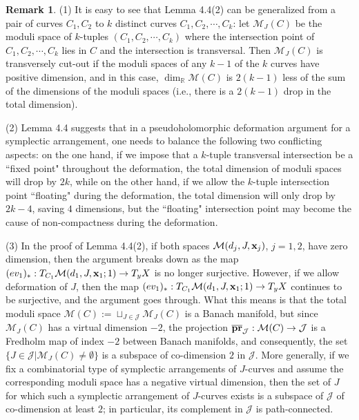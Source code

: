 \documentclass[11pt]{amsart}
\theoremstyle{plain}
\numberwithin{theorem}{section}
\theoremstyle{definition}
\newtheorem{remark}[theorem]{Remark}
\newcommand{\R}{{\mathbb R}}
\newcommand{\J}{{\mathcal J}}
\newcommand{\M}{{\mathcal M}}
\begin{document}
\begin{remark}
(1) It is easy to see that Lemma 4.4(2) can be generalized from a pair of curves $C_1,C_2$ to $k$ distinct curves 
$C_1,C_2,\cdots, C_k$: let $\M_J(C)$ be the moduli space of $k$-tuples $(C_1,C_2,\cdots,C_k)$ where the intersection point of $C_1,C_2,\cdots,C_k$ lies in $C$ and the intersection is transversal. Then $\M_J(C)$
is transversely cut-out if the moduli spaces of any $k-1$ of the $k$ curves have positive dimension, and in this case, 
$\dim_\R \M(C)$ is $2(k-1)$ less of the sum of the dimensions of the moduli spaces (i.e., there is a $2(k-1)$ drop in
the total dimension).

(2) Lemma 4.4 suggests that in a pseudoholomorphic deformation argument for a symplectic arrangement, one needs to balance the following two conflicting aspects: on the one hand, if we impose that a $k$-tuple transversal intersection be a ``fixed point" throughout the deformation, the total dimension of moduli spaces will drop by $2k$, while on the other hand, if we allow the $k$-tuple intersection point ``floating" during the deformation,  the total dimension will only drop by $2k-4$, saving $4$ dimensions, but the ``floating" intersection point may become the cause of non-compactness during the deformation.

(3) In the proof of Lemma 4.4(2), if both spaces $\M(d_j,J, {\bf x}_j)$, $j=1,2$, have zero dimension, then the argument breaks down as the map $(ev_1)_\ast: T_{C_1} \M(d_1,J, {\bf x}_1;1)\rightarrow T_y X$ is no longer surjective. 
However, if we allow deformation of $J$, then the map $(ev_1)_\ast: T_{C_1} \M(d_1,J, {\bf x}_1;1)\rightarrow T_y X$ continues to be surjective, and the argument goes through. What this means is that the total moduli space
$\M(C):=\sqcup_{J\in\J} \M_J(C)$ is a Banach manifold, but since $\M_J(C)$ has a virtual dimension $-2$, the 
projection $\overline{{\bf pr}}_\J: \M(C)\rightarrow \J$ is a Fredholm map of index $-2$ between Banach manifolds,
and consequently, the set $\{J\in\J |\M_J(C)\neq\emptyset\}$ is a subspace of co-dimension $2$ in $\J$. More generally, if we fix a combinatorial type of symplectic arrangements of $J$-curves and assume the corresponding moduli space has a negative virtual dimension, then the set of $J$ for which such a symplectic arrangement of $J$-curves exists is a subspace of $\J$ of co-dimension at least $2$; in particular, its complement in $\J$ is path-connected.


\end{remark}
\end{document}
